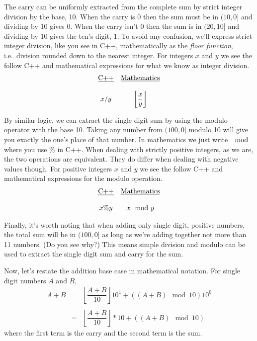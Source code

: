 \documentclass[10pt]{article}
\begin{document}
The carry can be uniformly extracted from the complete sum by strict integer division by the base, 10. When the carry is $0$ then the sum must be in $(10,0]$ and dividing by 10 gives 0. When the carry isn't $0$ then the sum is in $(20,10]$ and dividing by 10 gives the ten's digit, 1. To avoid any confusion, we'll express strict integer division, like you see in C++, mathematically as the \textit{floor function}, i.e.\ division rounded down to the nearest integer. For integers $x$ and $y$ we see the follow C++ and mathematical expressions for what we know as integer division.
\[
\begin{array}{cc}
\mbox{\underline{C++}} & \mbox{\underline{Mathematics}} \\ \\
x/y & \left\lfloor\dfrac{x}{y}\right\rfloor
\end{array}
\]

By similar logic, we can extract the single digit sum by using the modulo operator with the base 10. Taking any number from $(100,0]$ modulo 10 will give you exactly the one's place of that number. In mathematics we just write $\mod$ where you use $\%$ in C++. When dealing with strictly positive integers, as we are, the two operations are equivalent. They do differ when dealing with negative values though. For positive integers $x$ and $y$ we see the follow C++ and mathematical expressions for the modulo operation.
\[
\begin{array}{cc}
\mbox{\underline{C++}} & \mbox{\underline{Mathematics}} \\ \\
x\%y & x \mod y
\end{array}
\]

Finally, it's worth noting that when adding only single digit, positive numbers, the total sum will be in $(100,0]$ as long as we're adding together not more than 11 numbers. (Do you see why?) This means simple division and modulo can be used to extract the single digit sum and carry for the sum.

Now, let's restate the addition base case in mathematical notation. For single digit numbers $A$ and $B$,
\[
\begin{array}{rcl}
A+B &=& \left\lfloor\dfrac{A+B}{10}\right\rfloor10^1 + ((A+B)\mod 10)10^0 \\ \\
&=& \left\lfloor\dfrac{A+B}{10}\right\rfloor*10 + ((A+B)\mod 10)
\end{array}
\]
where the first term is the carry and the second term is the sum.
\end{document}
